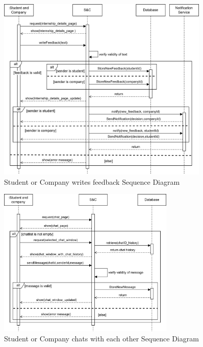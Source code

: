 \begin{figure}[H]
    \centering
    \includegraphics[width=0.9\textwidth]{Images/Sequence_Diagrams/feedback_SD.png}
    \caption{Student or Company writes feedback Sequence Diagram}
\end{figure}
\begin{figure}[H]
    \centering
    \includegraphics[width=0.75\textwidth]{Images/Sequence_Diagrams/chatting_SD.png}
    \caption{Student or Company chats with each other Sequence Diagram}
\end{figure}

